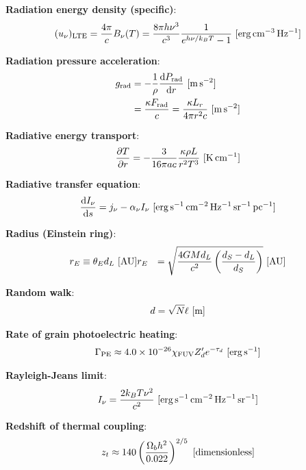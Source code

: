 \documentclass[a4paper,10pt]{article}
\begin{document}
{\noindent}\textbf{Radiation energy density (specific)}:
\begin{align*}
    (u_\nu)_{\rm LTE} = \frac{4\pi}{c}B_\nu(T) = \frac{8\pi h\nu^3}{c^3}\frac{1}{e^{h\nu/k_BT}-1} ~ [{\rm erg\,cm^{-3}\,Hz^{-1}}]
\end{align*}

{\noindent}\textbf{Radiation pressure acceleration}:
\begin{align*}
    g_{\rm rad} &= -\frac{1}{\rho} \frac{{\rm d}P_{\rm rad}}{{\rm d}r} ~ [{\rm m\,s^{-2}}] \\
    &= \frac{\kappa F_{\rm rad}}{c} = \frac{\kappa L_r}{4\pi r^2c} ~ [{\rm m\,s^{-2}}]
\end{align*}

{\noindent}\textbf{Radiative energy transport}:
\begin{align*}
    \frac{\partial T}{\partial r} = - \frac{3}{16\pi ac} \frac{\kappa\rho L}{r^2T^3} ~ [{\rm K\,cm^{-1}}]
\end{align*}

{\noindent}\textbf{Radiative transfer equation}:
\begin{align*}
    \frac{\mathrm{d}I_\nu}{\mathrm{d}s} = j_\nu - \alpha_\nu I_\nu ~ [{\rm erg\,s^{-1}\,cm^{-2}\,Hz^{-1}\,sr^{-1}\,pc^{-1}}]
\end{align*}

{\noindent}\textbf{Radius (Einstein ring)}:
\begin{align*}
    r_E &\equiv \theta_E d_L ~ [{\rm AU}]
    r_E &= \sqrt{\frac{4GMd_L}{c^2} \left(\frac{d_S-d_L}{d_S}\right)} ~ [{\rm AU}]
\end{align*}

{\noindent}\textbf{Random walk}:
\begin{align*}
    d = \sqrt{N}\ell ~ [{\rm m}]
\end{align*}

{\noindent}\textbf{Rate of grain photoelectric heating}:
\begin{align*}
    \Gamma_{\rm PE} \approx 4.0\times10^{-26}\chi_{\rm FUV}Z_d'e^{-\tau_d} ~ [{\rm erg\,s^{-1}}]
\end{align*}

{\noindent}\textbf{Rayleigh-Jeans limit}:
\begin{align*}
    I_\nu = \frac{2k_BT\nu^2}{c^2} ~ [{\rm erg\,s^{-1}\,cm^{-2}\,Hz^{-1}\,sr^{-1}}]
\end{align*}

{\noindent}\textbf{Redshift of thermal coupling}:
\begin{align*}
    z_t \approx 140\left(\frac{\Omega_bh^2}{0.022}\right)^{2/5} ~ [{\rm dimensionless}]
\end{align*}
\end{document}
